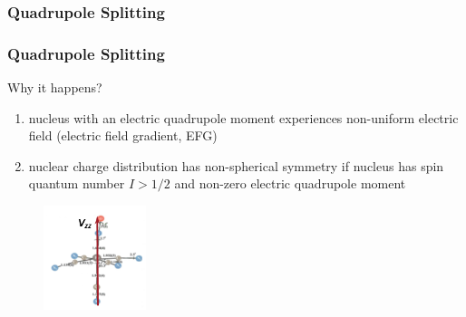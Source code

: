 \subsubsection{Quadrupole Splitting}

	\begin{frame}
		\frametitle{Quadrupole Splitting}
		\begin{block}{Why it happens?}
			\begin{enumerate}
				\item nucleus with an electric quadrupole moment experiences non-uniform electric field (electric field gradient, EFG)
				\item nuclear charge distribution has non-spherical symmetry if nucleus has spin quantum number \textbf{$I > 1/2$} and non-zero electric quadrupole moment
			\end{enumerate}
		
			\begin{figure}
				\centering
				\includegraphics[width=3cm]{images/absorber-crystal-structure.png}
			\end{figure}
		\end{block}
	\end{frame}

